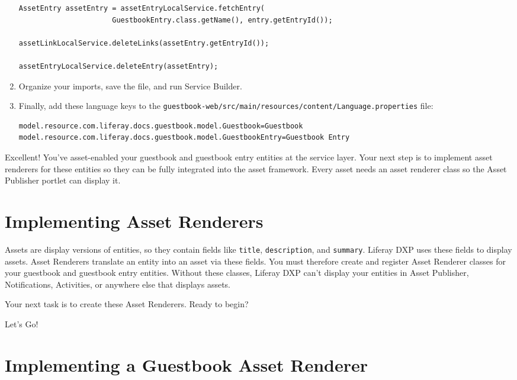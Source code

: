 \begin{enumerate}
\begin{verbatim}
AssetEntry assetEntry = assetEntryLocalService.fetchEntry(
                      GuestbookEntry.class.getName(), entry.getEntryId());

assetLinkLocalService.deleteLinks(assetEntry.getEntryId());

assetEntryLocalService.deleteEntry(assetEntry);
\end{verbatim}
\item
  Organize your imports, save the file, and run Service Builder.
\item
  Finally, add these language keys to the
  \texttt{guestbook-web/src/main/resources/content/Language.properties}
  file:

\begin{verbatim}
model.resource.com.liferay.docs.guestbook.model.Guestbook=Guestbook
model.resource.com.liferay.docs.guestbook.model.GuestbookEntry=Guestbook Entry
\end{verbatim}
\end{enumerate}

Excellent! You've asset-enabled your guestbook and guestbook entry
entities at the service layer. Your next step is to implement asset
renderers for these entities so they can be fully integrated into the
asset framework. Every asset needs an asset renderer class so the Asset
Publisher portlet can display it.

\chapter{Implementing Asset
Renderers}\label{implementing-asset-renderers}

Assets are display versions of entities, so they contain fields like
\texttt{title}, \texttt{description}, and \texttt{summary}. Liferay DXP
uses these fields to display assets. Asset Renderers translate an entity
into an asset via these fields. You must therefore create and register
Asset Renderer classes for your guestbook and guestbook entry entities.
Without these classes, Liferay DXP can't display your entities in Asset
Publisher, Notifications, Activities, or anywhere else that displays
assets.

Your next task is to create these Asset Renderers. Ready to begin?

Let's Go!{}

\chapter{Implementing a Guestbook Asset
Renderer}\label{implementing-a-guestbook-asset-renderer}

